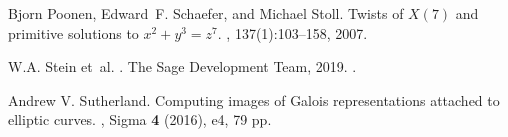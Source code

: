 \documentclass[12pt]{amsart}
\numberwithin{equation}{section}
\theoremstyle{definition}
\theoremstyle{remark}
\newcommand{\Magma}{{\sc Magma}}
\begin{document}
\begin{thebibliography}{999}
Bjorn Poonen, Edward~F. Schaefer, and Michael Stoll.
\newblock Twists of {$X(7)$} and primitive solutions to {$x^2+y^3=z^7$}.
, 137(1):103--158, 2007.

W.\thinspace{}A. Stein et~al.
.
\newblock The Sage Development Team, 2019.
.

Andrew V. Sutherland.
\newblock Computing images of Galois representations attached to elliptic curves.
, Sigma {\bf 4} (2016), e4, 79 pp.

    
\begin{comment}
 
\bibitem{AnniSiksek} S.\ Anni and S.\ Siksek,
{\em Modular elliptic curves over real abelian fields and the generalized {F}ermat equation $x^{2\ell} + y^{2m}=z^p$}, Algebra \& Number Theory {\bf 10} (2016), no.6, 1147--1172


\bibitem{BennetSkinner} M.\ A.\ Bennett and C.\ M.\ Skinner,
{\em Ternary Diophantine equations via Galois representations and modular forms}, Canad.\ J.\ Math.\ {\bf 56} (2004), no. 1, 23--54.
 


\bibitem{programs} N. Billerey, I. Chen, L. Demb\'el\'e, L. Dieulefait, and N. Freitas, 
{\em Supporting {{\Magma}} program files for this paper},
\url{http://math.univ-bpclermont.fr/~billerey/Research/BCDDF/}

\bibitem{BCDF} N. Billerey, I. Chen. L. Dieulefait, and N. Freitas, 
{\em A multi-Frey approach to Fermat equations of signature $(r,r,p)$},
Transactions of AMS (to appear).

\bibitem{BD14} C.~Breuil, and F.~Diamond,
{\em Formes modulaires de Hilbert modulo $p$ et valeurs d'extensions entre caract\`eres galoisiens.}
Ann. Sci. \'Ec. Norm. Sup\'er. (4) {\bf 47} (2014), no. 5, 905--974.


\end{comment}
\end{thebibliography}
\end{document}
